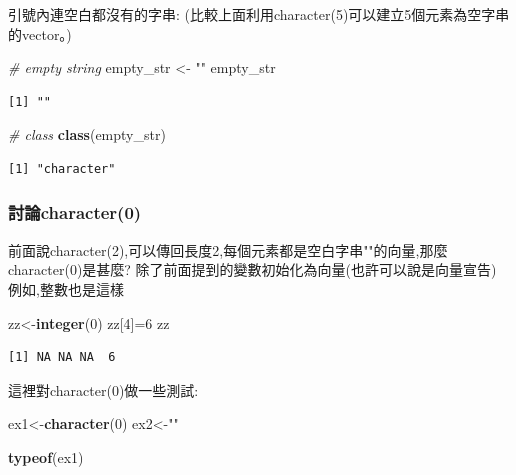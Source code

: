 \documentclass[]{book}
\newenvironment{Shaded}{\begin{snugshade}}{\end{snugshade}}
\newcommand{\CommentTok}[1]{\textcolor[rgb]{0.56,0.35,0.01}{\textit{#1}}}
\newcommand{\DecValTok}[1]{\textcolor[rgb]{0.00,0.00,0.81}{#1}}
\newcommand{\KeywordTok}[1]{\textcolor[rgb]{0.13,0.29,0.53}{\textbf{#1}}}
\newcommand{\NormalTok}[1]{#1}
\newcommand{\StringTok}[1]{\textcolor[rgb]{0.31,0.60,0.02}{#1}}
\theoremstyle{definition}
\theoremstyle{definition}
\theoremstyle{definition}
\theoremstyle{remark}
\begin{document}
引號內連空白都沒有的字串:
(比較上面利用character(5)可以建立5個元素為空字串的vector。)

\begin{Shaded}
\begin{Highlighting}[]
\CommentTok{# empty string}
\NormalTok{empty_str <-}\StringTok{ ""}
\NormalTok{empty_str}
\end{Highlighting}
\end{Shaded}

\begin{verbatim}
[1] ""
\end{verbatim}

\begin{Shaded}
\begin{Highlighting}[]
\CommentTok{# class}
\KeywordTok{class}\NormalTok{(empty_str)}
\end{Highlighting}
\end{Shaded}

\begin{verbatim}
[1] "character"
\end{verbatim}

\hypertarget{character0}{%
\subsubsection{討論character(0)}\label{character0}}

前面說character(2),可以傳回長度2,每個元素都是空白字串""的向量,那麼character(0)是甚麼?
除了前面提到的變數初始化為向量(也許可以說是向量宣告) 例如,整數也是這樣

\begin{Shaded}
\begin{Highlighting}[]
\NormalTok{zz<-}\KeywordTok{integer}\NormalTok{(}\DecValTok{0}\NormalTok{)}
\NormalTok{zz[}\DecValTok{4}\NormalTok{]=}\DecValTok{6}
\NormalTok{zz}
\end{Highlighting}
\end{Shaded}

\begin{verbatim}
[1] NA NA NA  6
\end{verbatim}

這裡對character(0)做一些測試:

\begin{Shaded}
\begin{Highlighting}[]
\NormalTok{ex1<-}\KeywordTok{character}\NormalTok{(}\DecValTok{0}\NormalTok{) }
\NormalTok{ex2<-}\StringTok{""}

\KeywordTok{typeof}\NormalTok{(ex1)}
\end{Highlighting}
\end{Shaded}
\end{document}
